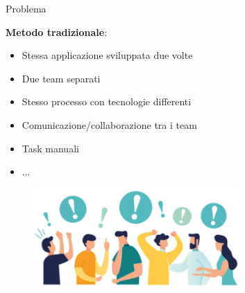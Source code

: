 \begin{frame}{Problema}

    \textbf{Metodo tradizionale}:
    \begin{itemize}
        \item Stessa applicazione sviluppata due volte
        \item Due team separati
        \item Stesso processo con tecnologie differenti
        \item Comunicazione/collaborazione tra i team
        \item Task manuali
        \item ...
    \end{itemize}

    \vspace{9mm}

    \begin{figure}[H]
        \includegraphics[width=0.7\textwidth]{img/Screenshot 2022-12-05 at 18.01.36.png}
    \end{figure}
    
\end{frame}


